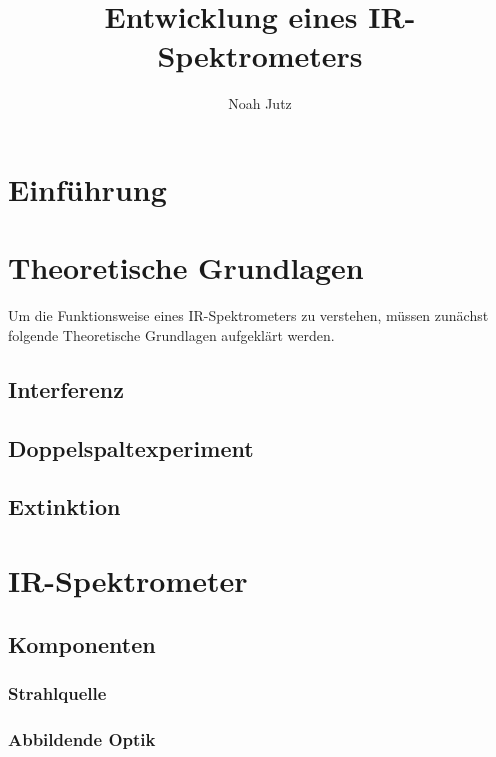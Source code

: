 \documentclass{article}
\title{Entwicklung eines IR-Spektrometers}
\author{Noah Jutz}
\date{}
\begin{document}
\maketitle
\tableofcontents

\newpage
\section{Einführung}


\newpage
\section{Theoretische Grundlagen}
Um die Funktionsweise eines IR-Spektrometers zu verstehen, müssen zunächst folgende Theoretische Grundlagen aufgeklärt werden.

\subsection{Interferenz}


\newpage
\subsection{Doppelspaltexperiment}


\newpage
\subsection{Extinktion}


\newpage
\section{IR-Spektrometer}

\subsection{Komponenten}

\subsubsection{Strahlquelle}


\subsubsection{Abbildende Optik}
\end{document}
